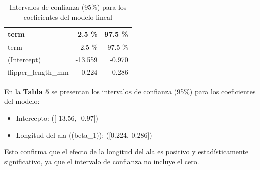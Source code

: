 \documentclass[
  spanish,
  11pt,
  a4paper,
  DIV=11,
  numbers=noendperiod]{scrartcl}
\providecommand{\tightlist}{%
  \setlength{\itemsep}{0pt}\setlength{\parskip}{0pt}}
\begin{document}
\begin{longtable}[]{@{}lrr@{}}
\caption{Intervalos de confianza (95\%) para los coeficientes del modelo
lineal}\tabularnewline
\toprule\noalign{}
term & 2.5 \% & 97.5 \% \\
\midrule\noalign{}
\endfirsthead
\toprule\noalign{}
term & 2.5 \% & 97.5 \% \\
\midrule\noalign{}
\endhead
\bottomrule\noalign{}
\endlastfoot
(Intercept) & -13.559 & -0.970 \\
flipper\_length\_mm & 0.224 & 0.286 \\
\end{longtable}

En la \textbf{Tabla 5} se presentan los intervalos de confianza (95\%)
para los coeficientes del modelo:

\begin{itemize}
\tightlist
\item
  Intercepto: ({[}-13.56, -0.97{]})
\item
  Longitud del ala ((beta\_1)): ({[}0.224, 0.286{]})
\end{itemize}

Esto confirma que el efecto de la longitud del ala es positivo y
estadísticamente significativo, ya que el intervalo de confianza no
incluye el cero.
\end{document}
